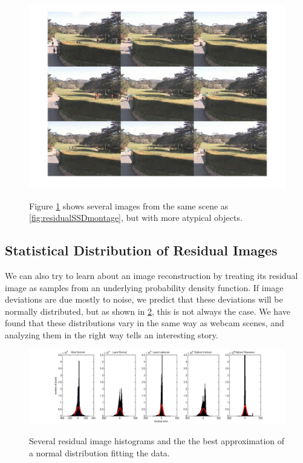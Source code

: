 \begin{figure}
	\centering
		\includegraphics[width=1\textwidth]{figures/residualZScoreMontage.jpg}
	\label{fig:residualZScoreMontage}
	
		\caption[Z-Score Montage.]{Figure \ref{fig:residualZScoreMontage} shows several images from the same scene as \ref{fig:residualSSDmontage}, but with more atypical objects.}
\end{figure}





\subsection{Statistical Distribution of Residual Images}

We can also try to learn about an image reconstruction by treating its residual image as samples from an 
underlying probability density function.  If image deviations are due mostly to noise, we predict that these deviations will be normally distributed, but as shown in \ref{fig:severalHists}, this is not always the case.  We have found that these distributions vary in the same way as webcam scenes, and analyzing them in the right way tells an interesting story.


\begin{figure}
	\centering
		\includegraphics[width=1\textwidth]{figures/severalHists2.jpg}
	\label{fig:severalHists}
	
		\caption[Several residual image histograms.]{Several residual image histograms and the the best approximation of a normal distribution fitting the data.}
\end{figure}



